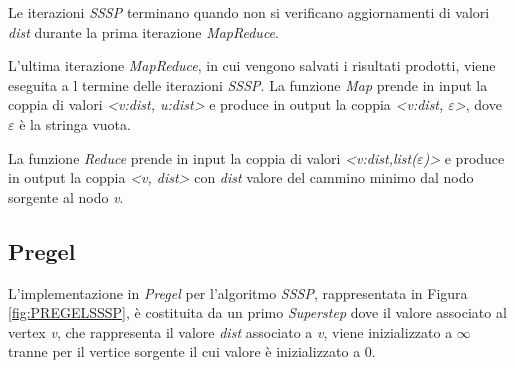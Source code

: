 \documentclass[LaM,binding=0.6cm]{sapthesis}
\begin{document}
Le iterazioni \textit{SSSP} terminano quando non si verificano aggiornamenti di valori \textit{dist} durante la  prima iterazione \textit{MapReduce}.

\begin{minipage}{\linewidth}
		
\end{minipage}

\begin{minipage}{\linewidth}
		
\end{minipage}

L'ultima iterazione \textit{MapReduce}, in cui vengono salvati i risultati prodotti, viene eseguita a l termine  delle iterazioni \textit{SSSP}.
La funzione \textit{Map} prende in input la coppia di valori \textit{<v:dist, u:dist>}  e produce in output la coppia \textit{<v:dist, $\varepsilon$>}, dove $\varepsilon$ è la stringa vuota.

La funzione \textit{Reduce} prende in input la coppia di valori \textit{<v:dist,list($\varepsilon$)>} e produce in output la coppia \textit{<v, dist>} con \textit{dist} valore del cammino minimo dal nodo sorgente al nodo \textit{v}.


\begin{minipage}{\linewidth}
		
\end{minipage}
\begin{minipage}{\linewidth}

\end{minipage}		

\subsection{Pregel}

L'implementazione in \textit{Pregel} per l'algoritmo \textit{SSSP}, rappresentata in Figura \ref{fig:PREGELSSSP}, è costituita da un primo \textit{Superstep} dove il valore associato al vertex \textit{v},  che rappresenta il valore \textit{dist} associato a \textit{v}, viene inizializzato a $\infty$ tranne per il vertice sorgente il cui valore è inizializzato a 0.
\end{document}
